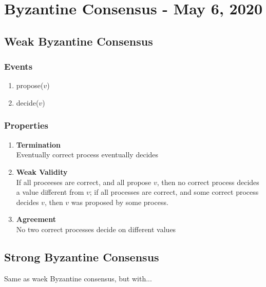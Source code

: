 \documentclass{article}
\begin{document}
	\section{Byzantine Consensus - May 6, 2020}
	\begin{adjustwidth}{2em}{2em}
		\subsection{Weak Byzantine Consensus}
		\begin{adjustwidth}{2em}{2em}
			\subsubsection{Events}
			\begin{adjustwidth}{2em}{}
				\begin{enumerate}[-]
					\item propose($v$)
					\item decide($v$)
				\end{enumerate}
			\end{adjustwidth}
			\subsubsection{Properties}
			\begin{adjustwidth}{2em}{}
				\begin{enumerate}[-]
					\item \textbf{Termination} \\
					Eventually correct process eventually decides
					\item \textbf{Weak Validity} \\
					If all proceeses are correct, and all propose $v$, then no correct process decides a value different from $v$; if all processes are correct, and some correct process decides $v$, then $v$ was proposed by some process.
					\item \textbf{Agreement} \\
					No two correct processes decide on different values
				\end{enumerate}
			\end{adjustwidth}
		\end{adjustwidth}
		\subsection{Strong Byzantine Consensus}
		\begin{adjustwidth}{2em}{2em}
			Same as waek Byzantine consensus, but with...

\end{adjustwidth}
\end{adjustwidth}
\end{document}
